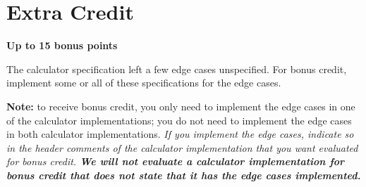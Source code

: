 \documentclass[12pt]{article}
\begin{document}
\section{Extra Credit} \label{bonus}

\textbf{Up to 15 bonus points}

The calculator specification left a few edge cases unspecified. For bonus
credit, implement some or all of these specifications for the edge cases.

\textbf{Note: } to receive bonus credit, you only need to implement the edge
cases in one of the calculator implementations; you do not need to implement
the edge cases in both calculator implementations. \textit{If you implement the
edge cases, indicate so in the header comments of the calculator implementation
that you want evaluated for bonus credit. \textbf{We will not evaluate a
calculator implementation for bonus credit that does not state that it has the
edge cases implemented.}}
\end{document}

